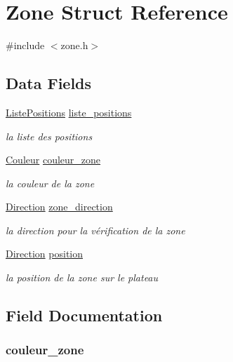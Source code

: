\hypertarget{struct_zone}{\section{Zone Struct Reference}
\label{struct_zone}
}


{\ttfamily \#include $<$zone.\-h$>$}

\subsection*{Data Fields}
\begin{DoxyCompactItemize}
\item 
\hyperlink{struct_liste_positions}{Liste\-Positions} \hyperlink{struct_zone_a2336e623c3d6d88cb83d7bf8408b3595}{liste\-\_\-positions}
\begin{DoxyCompactList}\small\item\em la liste des positions \end{DoxyCompactList}\item 
\hyperlink{couleur_8h_aa304d0ca681f782b1d7735da33037dd7}{Couleur} \hyperlink{struct_zone_ab5fe9da9d6e44059f4892ce64f412af0}{couleur\-\_\-zone}
\begin{DoxyCompactList}\small\item\em la couleur de la zone \end{DoxyCompactList}\item 
\hyperlink{direction_8h_a224b9163917ac32fc95a60d8c1eec3aa}{Direction} \hyperlink{struct_zone_a1db1a3431f9c0ab20b1dad0cb24c6f13}{zone\-\_\-direction}
\begin{DoxyCompactList}\small\item\em la direction pour la vérification de la zone \end{DoxyCompactList}\item 
\hyperlink{direction_8h_a224b9163917ac32fc95a60d8c1eec3aa}{Direction} \hyperlink{struct_zone_ad87e572069283c424e2d7c151ce04605}{position}
\begin{DoxyCompactList}\small\item\em la position de la zone sur le plateau \end{DoxyCompactList}\end{DoxyCompactItemize}


\subsection{Field Documentation}
\hypertarget{struct_zone_ab5fe9da9d6e44059f4892ce64f412af0}{
\subsubsection[{couleur\-\_\-zone}]{ couleur\-\_\-zone}}\label{struct_zone_ab5fe9da9d6e44059f4892ce64f412af0}


